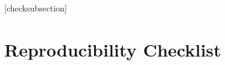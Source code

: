 

% 


[checksubsection]

\newcommand{\checksubsection}[1]{%
  \refstepcounter{checksubsection}%
  \paragraph{\arabic{checksubsection}. #1}%
  \setcounter{checkitem}{0}%
}

\newcommand{\checkitem}{%
  \refstepcounter{checkitem}%
  \item[\arabic{checksubsection}.\arabic{checkitem}.]%
}
\newcommand{\question}[2]{\normalcolor\checkitem #1 #2 \color{blue}}
\newcommand{\ifyespoints}[1]{\makebox[0pt][l]{\hspace{-15pt}\normalcolor #1}}

\section*{Reproducibility Checklist}



